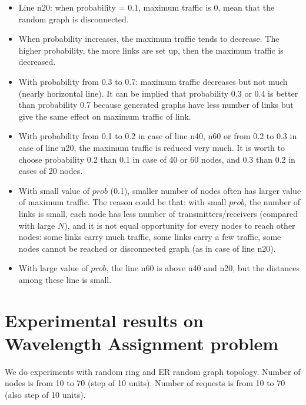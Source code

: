 \documentclass[a4paper]{article}
\begin{document}
\begin{itemize}
  	\item Line n20: when probability = 0.1, maximum traffic is 0, mean that the random graph is disconnected.
  	\item When probability increases, the maximum traffic tends to decrease. The higher probability, the more links are set up, then the maximum traffic is decreased. 
    \item With probability from 0.3 to 0.7: maximum traffic decreases but not much (nearly horizontal line). It can be implied that probability 0.3 or 0.4 is  better than probability 0.7 because generated graphs have less number of links but give the same effect on maximum traffic of link.
    \item With probability from 0.1 to 0.2 in case of line n40, n60 or from 0.2 to 0.3 in case of line n20, the maximum traffic is reduced very much. It is worth to choose probability 0.2 than 0.1 in case of 40 or 60 nodes, and 0.3 than 0.2 in cases of 20 nodes.
    \item With small value of $prob$ (0.1), smaller number of nodes often has larger value of maximum traffic. The reason could be that: with small $prob$, the number of links is small, each node has less number of transmitters/receivers (compared with large $N$), and it is not equal opportunity for every nodes to reach other nodes: some links carry much traffic, some links carry a few traffic, some nodes cannot be reached or disconnected graph (as in case of line n20).
    \item With large value of $prob$, the line n60 is above n40 and n20, but the distances among these line is small.
    \end{itemize}
    
\section{Experimental results on Wavelength Assignment problem}
We do experiments with random ring and ER random graph topology. Number of nodes is from 10 to 70 (step of 10 units). Number of requests is from 10 to 70 (also step of 10 units).
\end{document}
